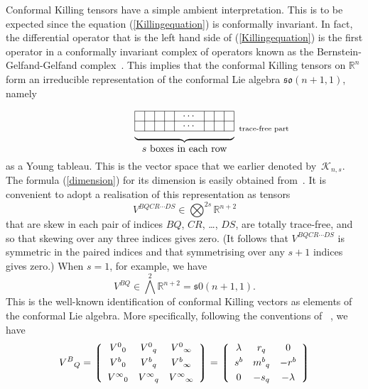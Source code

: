 \documentclass[a4paper,12pt]{amsart}
\begin{document}
Conformal Killing tensors have a simple ambient interpretation. This is to be
expected since the equation (\ref{Killingequation}) is conformally invariant.
In fact, the differential operator that is the left hand side of
(\ref{Killingequation}) is the first operator in a conformally invariant
complex of operators known as the Bernstein-Gelfand-Gelfand
complex~\cite{beastwood,bgg,cd,css,l}. This implies that the conformal Killing
tensors on ${\mathbb R}^n$ form an irreducible representation of the conformal
Lie algebra ${\mathfrak{so}}(n+1,1)$, namely
$$\underbrace{\begin{picture}(100,30)
\put(0,5){\line(1,0){100}}
\put(0,15){\line(1,0){100}}
\put(0,25){\line(1,0){100}}
\put(0,5){\line(0,1){20}}
\put(10,5){\line(0,1){20}}
\put(20,5){\line(0,1){20}}
\put(30,5){\line(0,1){20}}
\put(40,5){\line(0,1){20}}
\put(70,5){\line(0,1){20}}
\put(80,5){\line(0,1){20}}
\put(90,5){\line(0,1){20}}
\put(100,5){\line(0,1){20}}
\put(55,10){\makebox(0,0){$\cdots$}}
\put(55,20){\makebox(0,0){$\cdots$}}
\put(105,7){\makebox(0,0)[l]{\scriptsize trace-free part}}
\end{picture}}_{\mbox{$s$ boxes in each row}}$$
as a Young tableau. This is the vector space that we earlier denoted
by~${\mathcal K}_{n,s}$. The formula (\ref{dimension}) for its dimension is
easily obtained from~\cite{ki}. It is convenient to adopt a realisation
of this representation as tensors
$$\textstyle V^{BQCR\cdots DS}\in\bigotimes^{2s}{\mathbb R}^{n+2}$$
that are skew in each pair of indices $BQ$, $CR$, \ldots, $DS$, are totally
trace-free, and so that skewing over any three indices gives zero. (It follows
that $V^{BQCR\cdots DS}$ is symmetric in the paired indices and that
symmetrising over any $s+1$ indices gives zero.) When $s=1$, for example, we
have
$$\textstyle V^{BQ}\in\bigwedge^2{\mathbb R}^{n+2}={\mathfrak{s0}}(n+1,1).$$
This is the well-known identification of conformal Killing vectors as elements
of the conformal Lie algebra. More specifically, following the conventions
of ~\cite{eg}, we have
$$V^B{}_Q=\left\lgroup\begin{array}{ccc}V^0{}_0&V^0{}_q&V^0{}_\infty\\[3pt]
V^b{}_0&V^b{}_q&V^b{}_\infty\\[3pt]
V^\infty{}_0&V^\infty{}_q&V^\infty{}_\infty\end{array}\right\rgroup=
\left\lgroup\begin{array}{ccc}\lambda&r_q&0\\[3pt]
s^b&m^b{}_q&-r^b\\[3pt]
0&-s_q&-\lambda\end{array}\right\rgroup$$
\end{document}
